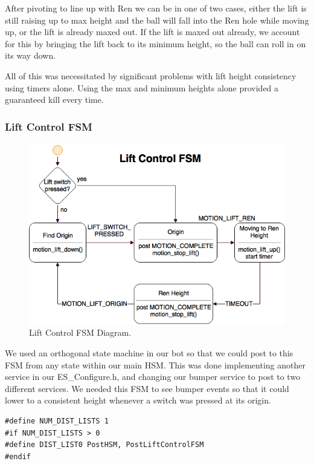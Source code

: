 \documentclass[]{article}
\begin{document}
After pivoting to line up with Ren we can be in one of two cases, either the lift is still raising up to max height and the ball will fall into the Ren hole while moving up, or the lift is already maxed out. If the lift is maxed out already, we account for this by bringing the lift back to its minimum height, so the ball can roll in on its way down.

All of this was necessitated by significant problems with lift height consistency using timers alone. Using the max and minimum heights alone provided a guaranteed kill every time.

\subsubsection{Lift Control FSM}
\begin{figure}[H]
    \centering
    \includegraphics[scale=0.60]{lift-control-fsm.png}
    \caption{Lift Control FSM Diagram.}
    \label{fig: lift control fsm}
\end{figure}

We used an orthogonal state machine in our bot so that we could post to this FSM from any state within our main HSM. This was done implementing another service in our ES\_Configure.h, and changing our bumper service to post to two different services. We needed this FSM to see bumper events so that it could lower to a consistent height whenever a switch was pressed at its origin.
\begin{lstlisting}
#define NUM_DIST_LISTS 1
#if NUM_DIST_LISTS > 0 
#define DIST_LIST0 PostHSM, PostLiftControlFSM
#endif
\end{lstlisting}
\end{document}
